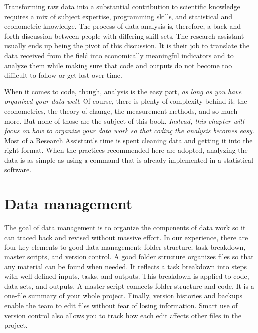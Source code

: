 
\begin{fullwidth}
Transforming raw data into a substantial contribution to scientific knowledge 
requires a mix of subject expertise, programming skills, 
and statistical and econometric knowledge. 
The process of data analysis is, therefore, 
a back-and-forth discussion between people 
with differing skill sets. 
The research assistant usually ends up being the pivot of this discussion. 
It is their job to translate the data received from the field into
economically meaningful indicators and to analyze them 
while making sure that code and outputs do not become too difficult to follow or get lost over time.

When it comes to code, though, analysis is the easy part, 
\textit{as long as you have organized your data well}. 
Of course, there is plenty of complexity behind it: 
the econometrics, the theory of change, the measurement methods, and so much more.
But none of those are the subject of this book. 
\textit{Instead, this chapter will focus on how to organize your data work so that coding the analysis becomes easy}.
Most of a Research Assistant's time is spent cleaning data and getting it into the right format. 
When the practices recommended here are adopted,
analyzing the data is as simple as using a command that is already implemented in a statistical software. 


\end{fullwidth}


\section{Data management}
The goal of data management is to organize the components of data work 
so it can traced back and revised without massive effort.
In our experience, there are four key elements to good data management: 
folder structure, task breakdown, master scripts, and version control. 
A good folder structure organizes files so that any material can be found when needed.
It reflects a task breakdown into steps with well-defined inputs, tasks, and outputs.
This breakdown is applied to code, data sets, and outputs.
A master script connects folder structure and code.
It is a one-file summary of your whole project.
Finally, version histories and backups enable the team 
to edit files without fear of losing information.
Smart use of version control also allows you to track 
how each edit affects other files in the project.

